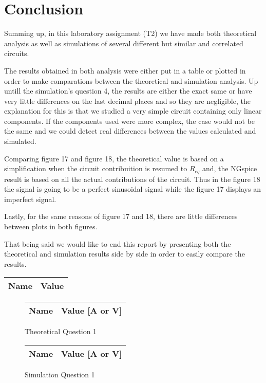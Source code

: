 \section{Conclusion}
\label{sec:conclusion}

Summing up, in this laboratory assignment (T2) we have made both theoretical analysis as well as simulations of several different but similar and correlated circuits. \par
The results obtained in both analysis were either put in a table or plotted in order to make comparations between the theoretical and simulation analysis.
Up untill the simulation's question 4, the results are either the exact same or have very little differences on the last decimal places and so they are negligible, the explanation for this is that we studied a very simple circuit containing only linear components. If the components used were more complex, the case would not be the same and we could detect real differences between the values calculated and simulated. \par
Comparing figure 17 and figure 18, the theoretical value is based on a simplification when the circuit contribuition is resumed to $R_{eq}$ and, the NGspice result is based on all the actual contributions of the circuit. Thus in the figure 18 the signal is going to be a perfect sinusoidal signal while the figure 17 displays an imperfect signal. \par
Lastly, for the same reasons of figure 17 and 18, there are little differences between plots in both figures. \par
That being said we would like to end this report by presenting both the theoretical and simulation results side by side in order to easily compare the results. \par

\begin{center}
  \begin{tabular}{ | c | c | }
    \hline    
    {\bf Name} & {\bf Value} \\ \hline
    
    \hline
  \end{tabular}
\end{center}

\begin{figure}[H]
      \centering
      \begin{tabular}{ | c | c | }
      \hline    
      {\bf Name} & {\bf Value [A or V]} \\ \hline
      \hline
      \end{tabular}
      \caption{Theoretical Question 1}
    \endminipage\hfill
      \centering
      \begin{tabular}{ | c | c | }
      \hline    
      {\bf Name} & {\bf Value [A or V]} \\ \hline
      \end{tabular}
      \caption{Simulation Question 1}
    \endminipage\hfill
\end{figure}
